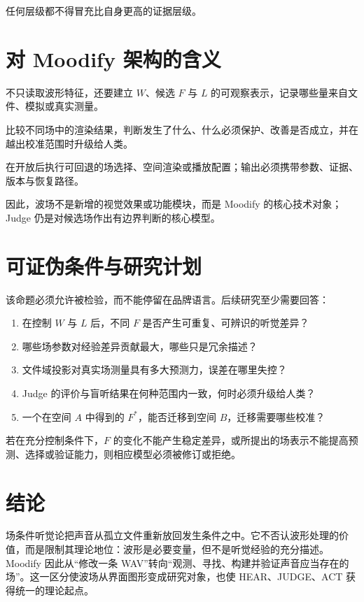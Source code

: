 \documentclass[10pt,a4paper]{article}
\begin{document}
任何层级都不得冒充比自身更高的证据层级。

\section{对 Moodify 架构的含义}
\begin{description}[style=nextline,leftmargin=0pt]
\item[HEAR] 不只读取波形特征，还要建立 $W$、候选 $F$ 与 $L$ 的可观察表示，记录哪些量来自文件、模拟或真实测量。
\item[JUDGE] 比较不同场中的渲染结果，判断发生了什么、什么必须保护、改善是否成立，并在越出校准范围时升级给人类。
\item[ACT] 在开放后执行可回退的场选择、空间渲染或播放配置；输出必须携带参数、证据、版本与恢复路径。
\end{description}

因此，波场不是新增的视觉效果或功能模块，而是 Moodify 的核心技术对象；Judge 仍是对候选场作出有边界判断的核心模型。

\section{可证伪条件与研究计划}
该命题必须允许被检验，而不能停留在品牌语言。后续研究至少需要回答：
\begin{enumerate}[leftmargin=1.6em,itemsep=.35em]
\item 在控制 $W$ 与 $L$ 后，不同 $F$ 是否产生可重复、可辨识的听觉差异？
\item 哪些场参数对经验差异贡献最大，哪些只是冗余描述？
\item 文件域投影对真实场测量具有多大预测力，误差在哪里失控？
\item Judge 的评价与盲听结果在何种范围内一致，何时必须升级给人类？
\item 一个在空间 $A$ 中得到的 $F^{*}$，能否迁移到空间 $B$，迁移需要哪些校准？
\end{enumerate}

若在充分控制条件下，$F$ 的变化不能产生稳定差异，或所提出的场表示不能提高预测、选择或验证能力，则相应模型必须被修订或拒绝。

\section{结论}
场条件听觉论把声音从孤立文件重新放回发生条件之中。它不否认波形处理的价值，而是限制其理论地位：波形是必要变量，但不是听觉经验的充分描述。Moodify 因此从“修改一条 WAV”转向“观测、寻找、构建并验证声音应当存在的场”。这一区分使波场从界面图形变成研究对象，也使 HEAR、JUDGE、ACT 获得统一的理论起点。
\end{document}
